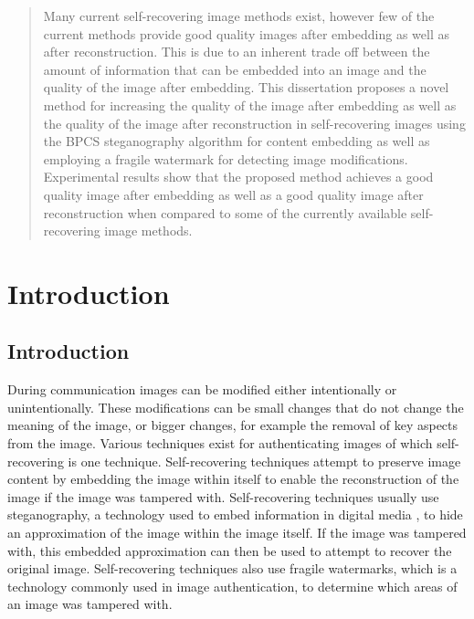 \documentclass[12pt]{article}
\begin{document}
\maketitle

\begin{abstract}

\noindent 
Many current self-recovering image methods exist, however few of the current methods provide good quality images after embedding as well as after reconstruction.
This is due to an inherent trade off between the amount of information that can be embedded into an image and the quality of the image after embedding.
This dissertation proposes a novel method for increasing the quality of the image after embedding as well as the quality of the image after reconstruction in self-recovering images using the BPCS steganography algorithm for content embedding as well as employing a fragile watermark for detecting image modifications.
Experimental results show that the proposed method achieves a good quality image after embedding as well as a good quality image after reconstruction when compared to some of the currently available self-recovering image methods. 

\end{abstract}

\tableofcontents
\section{Introduction}

\subsection{Introduction}
During communication images can be modified either intentionally or unintentionally.  These modifications can be small changes that do not change the meaning of the image, or bigger changes, for example the removal of key aspects from the image. 
Various techniques exist for authenticating images of which self-recovering is one technique. 
Self-recovering techniques attempt to preserve image content by embedding the image within itself to enable the reconstruction of the image if the image was tampered with. Self-recovering techniques usually use steganography, a technology used to embed information in digital media \cite{johnson1998exploring}, to hide an approximation of the image within the image itself.  
If the image was tampered with, this embedded approximation can then be used to attempt to recover the original image.
 Self-recovering techniques also use fragile watermarks, which is a technology commonly used in image authentication, to determine which areas of an image was tampered with.
\end{document}
